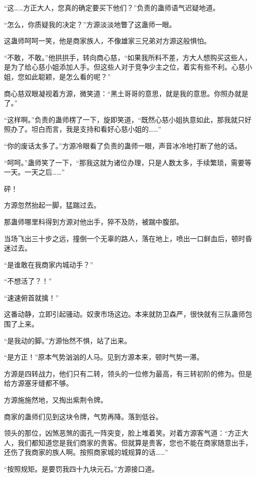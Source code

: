 
\begin{this_body}

“这……方正大人，您真的确定要买下他们？”负责的蛊师语气迟疑地道。

“怎么，你质疑我的决定？”方源淡淡地瞥了这蛊师一眼。

这蛊师呵呵一笑，他是商家族人，不像雄家三兄弟对方源这般惧怕。

“不敢，不敢。”他拱拱手，转向商心慈，“如果我所料不差，方大人想购买这些人，是为了给心慈小姐添加人手。但这些人对于竞争少主之位，着实有些不利。心慈小姐，您如此聪颖，是怎么看的呢？”

商心慈双眼凝视着方源，微笑道：“黑土哥哥的意思，就是我的意思。你照办就是了。”

“这样啊。”负责的蛊师楞了一下，旋即笑道，“既然心慈小姐执意如此，那我就只好照办了。坦白而言，我是支持和看好心慈小姐的……”

“你的废话太多了。”方源冷眼看了负责的蛊师一眼，声音冰冷地打断了他的话。

“呵呵。”蛊师笑了一下，“那我这就为诸位办理，只是人数太多，手续繁琐，需要等一天。一天之后……”

砰！

方源忽然抬起一脚，猛踹过去。

那蛊师哪里料得到方源对他出手，猝不及防，被踹中腹部。

当场飞出三十步之远，撞倒一个无辜的路人，落在地上，喷出一口鲜血后，顿时昏迷过去。

“是谁敢在我商家内城动手？”

“不想活了？！”

“速速俯首就擒！”

这番动静，立即引起骚动。奴隶市场这边。本来就防卫森严，很快就有三队蛊师包围了上来。

“是我动的脚。”方源怡然不惧，站了出来。

“是方正！”原本气势汹汹的人马。见到方源本来，顿时气势一滞。

方源是四转战力，他们只有二转，领头的一位修为最高，有三转初阶的修为。但是给方源塞牙缝都不够。

方源施施然地，又掏出紫荆令牌。

商家的蛊师们见到这块令牌，气势再降。落到低谷。

领头的那位，凶煞恶煞的面孔一阵突变，脸上堆着笑。对着方源客气道：“方正大人，我们都知道您是我们商家的贵客。但就算是贵客，您也不能在商家随意出手，还伤了我商家的族人啊。按照商家城的城规算的话……”

“按照规矩。是要罚我四十九块元石。”方源接口道。


\end{this_body}
